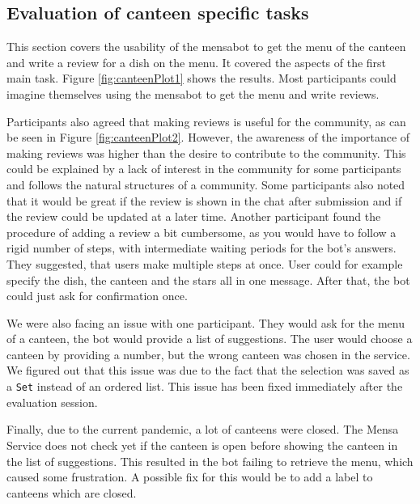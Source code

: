 \subsection{Evaluation of canteen specific tasks}  
This section covers the usability of the mensabot to get the menu of the canteen and write a review for a dish on the menu. It covered the aspects of the first main task. Figure \ref{fig:canteenPlot1} shows the results. Most participants could imagine themselves using the mensabot to get the menu and write reviews.
 
Participants also agreed that making reviews is useful for the community, as can be seen in Figure \ref{fig:canteenPlot2}. 
However, the awareness of the importance of making reviews was higher than the desire to contribute to the community. This could be explained by a lack of interest in the community for some participants and follows the natural structures of a community.
Some participants also noted that it would be great if the review is shown in the chat after submission and if the review could be updated at a later time.
Another participant found the procedure of adding a review a bit cumbersome, as you would have to follow a rigid number of steps, with intermediate waiting periods for the bot's answers. They suggested, that users make multiple steps at once. User could for example specify the dish, the canteen and the stars all in one message. After that, the bot could just ask for confirmation once.

We were also facing an issue with one participant. They would ask for the menu of a canteen, the bot would provide a list of suggestions. The user would choose a  canteen by providing a number, but the wrong canteen was chosen in the service. We figured out that this issue was due to the fact that the selection was saved as a \texttt{Set} instead of an ordered list.
This issue has been fixed immediately after the evaluation session.

Finally, due to the current pandemic, a lot of canteens were closed. The Mensa Service does not check yet if the canteen is open before showing the canteen in the list of suggestions. This resulted in the bot failing to retrieve the menu, which caused some frustration. A possible fix for this would be to add a label to canteens which are closed. 


